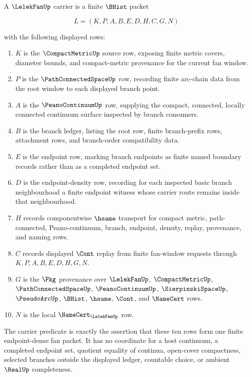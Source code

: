 \begin{definition}
\label{def:lelek-fan-carrier}
A $\LelekFanUp$ carrier is a finite $\BHist$ packet

$$
L=(K,P,A,B,E,D,H,C,G,N)
$$

with the following displayed rows:
\begin{enumerate}
\item $K$ is the $\CompactMetricUp$ source row, exposing finite metric covers, diameter bounds, and compact-metric provenance for the current fan window.
\item $P$ is the $\PathConnectedSpaceUp$ row, recording finite arc-chain data from the root window to each displayed branch point.
\item $A$ is the $\PeanoContinuumUp$ row, supplying the compact, connected, locally connected continuum surface inspected by branch consumers.
\item $B$ is the branch ledger, listing the root row, finite branch-prefix rows, attachment rows, and branch-order compatibility data.
\item $E$ is the endpoint row, marking branch endpoints as finite named boundary records rather than as a completed endpoint set.
\item $D$ is the endpoint-density row, recording for each inspected basic branch neighbourhood a finite endpoint witness whose carrier route remains inside that neighbourhood.
\item $H$ records componentwise $\hsame$ transport for compact metric, path-connected, Peano-continuum, branch, endpoint, density, replay, provenance, and naming rows.
\item $C$ records displayed $\Cont$ replay from finite fan-window requests through $K,P,A,B,E,D,H,G,N$.
\item $G$ is the $\Pkg$ provenance over $\LelekFanUp$, $\CompactMetricUp$, $\PathConnectedSpaceUp$, $\PeanoContinuumUp$, $\SierpinskiSpaceUp$, $\PseudoArcUp$, $\BHist$, $\hsame$, $\Cont$, and $\NameCert$ rows.
\item $N$ is the local $\NameCert_{\LelekFanUp}$ row.
\end{enumerate}
The carrier predicate is exactly the assertion that these ten rows form one finite endpoint-dense fan packet. It has no coordinate for a host continuum, a completed endpoint set, quotient equality of continua, open-cover compactness, selected branches outside the displayed ledger, countable choice, or ambient $\RealUp$ completeness.
\end{definition}

